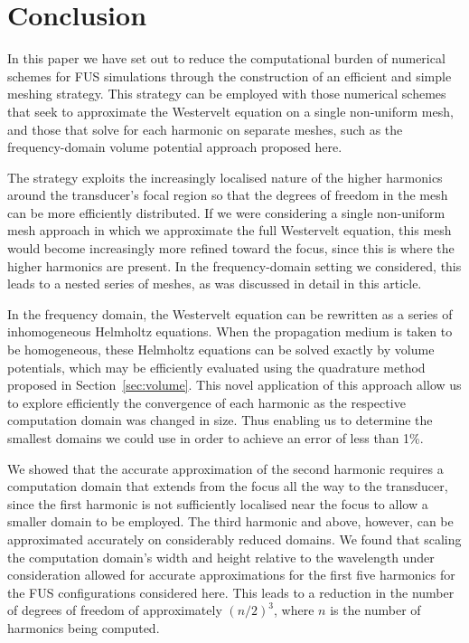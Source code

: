 \documentclass[preprint]{JASA}
\newcommand{\red}[1]{{\color{red} #1}}
\begin{document}
\section{\label{sec:conclusion}Conclusion}
In this paper we have set out to reduce the computational burden of numerical 
schemes for \red{FUS} simulations through the construction of an efficient and simple 
meshing strategy. This strategy can be employed with those numerical schemes that 
\red{seek to approximate the Westervelt equation on a single non-uniform mesh}, and those that solve 
for each harmonic on separate meshes, such as the frequency-domain volume potential 
approach proposed here.

The strategy exploits the increasingly localised nature of the higher harmonics 
around the transducer's focal region so that the degrees of freedom in the mesh
can be more efficiently distributed. If we were considering a single non-uniform mesh approach 
\red{in which we approximate the full Westervelt equation}, this mesh would become 
increasingly more refined toward the focus, since this is where the higher 
harmonics are present. In the frequency-domain setting we considered, this leads to a nested 
series of meshes, as was discussed in detail in this article.

In the frequency domain, the Westervelt equation can be rewritten as a series 
of inhomogeneous Helmholtz equations. When the propagation medium is taken to be 
homogeneous, these Helmholtz equations can be solved exactly by volume potentials, 
which may be efficiently evaluated using the quadrature method proposed in 
Section~\ref{sec:volume}. This novel application of this approach allow us to 
explore efficiently the convergence of each harmonic as the respective computation 
domain was changed in size. Thus enabling us to determine the smallest domains 
we could use in order to achieve an error of less than 1\%.

We showed that the accurate approximation of the second harmonic requires a 
computation domain that extends from the focus all the way to the transducer, since 
the first harmonic is not sufficiently localised near the focus to allow a 
smaller domain to be employed. The third harmonic and above, however, can be 
approximated accurately on considerably reduced domains. We found that 
scaling the computation domain's width and height relative to the wavelength 
under consideration allowed for accurate approximations for the first five 
harmonics for the \red{FUS} configurations considered here. This leads to a reduction 
in the number of degrees of freedom of approximately $(n/2)^3$, where $n$ is 
the number of harmonics being computed.
\end{document}
